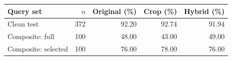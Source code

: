 \begin{tabular}{@{}lrrrr@{}}
\toprule
\textbf{Query set} & \textbf{$n$} & \textbf{Original (\%)} & \textbf{Crop (\%)} & \textbf{Hybrid (\%)} \\ \midrule
Clean test & 372 & 92.20 & 92.74 & 91.94 \\
Composite: full & 100 & 48.00 & 43.00 & 49.00 \\
Composite: selected & 100 & 76.00 & 78.00 & 76.00 \\
\bottomrule
\end{tabular}
